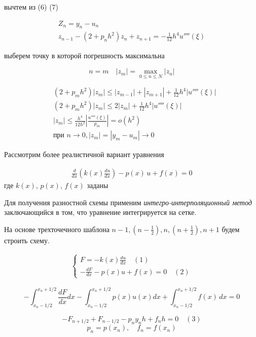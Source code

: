 вычтем из (6) (7)

\begin{align*}
Z_n = y_n - u_n \\
z_{n-1} - (2 + p_n h^2) z_n + z_{n+1} = - \frac{1}{12} h^4 u''''(\xi)
\end{align*}

выберем точку в которой погрешность максимальна

\[
	n = m \quad |z_m| = \max\limits_{0 \leq n \leq N} |z_n|
\]

\begin{align*}
&(2 + p_m h^2)|z_m| \leq |z_{m-1}| + |z_{m+1}| + \frac{1}{12} h^4 |u''''(\xi)|\\
&(2 + p_m h^2)|z_m| \leq 2|z_m| + \frac{1}{12} h^4 |u''''(\xi)|\\
&|z_m| \leq \frac{h^4}{12 h^2} |\frac{u''''(\xi)}{p_m}| = o(h^2)\\
& \text{при } n \to 0, |z_m| = |y_m - u_m| \to 0
\end{align*}
	
	
	
	
	
	
	
	



Рассмотрим более реалистичной вариант уравнения

\begin{align*}
\frac{d}{dx} \left(k(x) \frac{du}{dx}\right) - p(x)\,u + f(x) = 0
\end{align*}
где $k(x)$, $p(x)$, $f(x)$ заданы

Для получения разностной схемы применим \emph{интегро-интерполяционный метод} заключающийся в том, что уравнение интегрируется на сетке.

На основе трехточечного шаблона $n-1, (n-\frac{1}{2}) , n, (n+\frac{1}{2}), n+1$ будем строить схему.

\begin{align*}
\begin{cases}
F = -k(x)\frac{du}{dx} \quad (1)\\
- \frac{dF}{dx} - p(x) u + f(x) = 0 \quad (2)
\end{cases}
\end{align*}

\[
	- \int_{x_n - 1/2}^{x_n + 1/2} \frac{dF}{dx} dx - \int_{x_n - 1/2}^{x_n + 1/2} p(x) u(x) dx + \int_{x_n - 1/2}^{x_n + 1/2} f(x)\, dx = 0
\]

\[
	-F_{n+1/2} + F_{n-1/2} - p_n y_n h + f_n h = 0 \quad (3)
\]
\[
	p_n = p(x_n), \quad f_n = f (x_n)
\]

